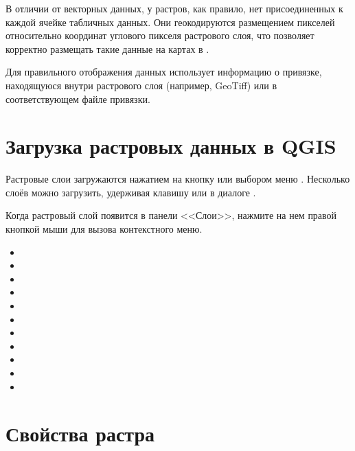 В отличии от векторных данных, у растров, как правило, нет присоединенных к каждой
ячейке табличных данных. Они геокодируются размещением пикселей относительно
координат углового пикселя растрового слоя, что позволяет корректно размещать
такие данные на картах в \qg.

Для правильного отображения данных \qg использует информацию о привязке,
находящуюся внутри растрового слоя (например, GeoTiff) или в соответствующем файле
привязки.

\section{Загрузка растровых данных в QGIS}\label{label_loadraster}

Растровые слои загружаются нажатием на кнопку
 или выбором меню
 \arrow
{}.
Несколько слоёв можно загрузить, удерживая клавишу 
или  в диалоге .

Когда растровый слой появится в панели <<Слои>>, нажмите на нем правой
кнопкой мыши для вызова контекстного меню.


\begin{itemize}[label=--]
\item {}
\item {}
\item {}
\item {}
\item {}
\item {}
\item {}
\item {}
\item {}
\item {}
\item {}
\end{itemize}

\section{Свойства растра}\label{label_rasterprop}

